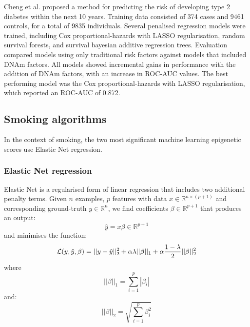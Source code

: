 \documentclass[draft]{article} %
\newcommand{\equationname}[1]{%
    \begingroup
        \leavevmode
        \addcontentsline{equ}{equations}{\protect\numberline{\theequation}#1}%
    \endgroup   
}
\begin{document}
Cheng et al. \cite{cheng2023development} proposed a method for predicting the risk of developing type 2 diabetes within the next 10 years. Training data consisted of 374 cases and \num{9461} controls, for a total of \num{9835} individuals. Several penalised regression models were trained, including Cox proportional-hazards with LASSO regularisation, random survival forests, and survival bayesian additive regression trees. Evaluation compared models using only traditional risk factors against models that included DNAm factors. All models showed incremental gains in performance with the addition of DNAm factors, with an increase in ROC-AUC values. The best performing model was the Cox proportional-hazards with LASSO regularisation, which reported an ROC-AUC of 0.872.

\subsection{Smoking algorithms}
In the context of smoking, the two most significant machine learning epigenetic scores use Elastic Net regression.

\subsubsection{Elastic Net regression} \label{sec:lin-elastic-net}
Elastic Net \cite{zou2005regularization} is a regularised form of linear regression that includes two additional penalty terms.
Given \(n\) examples, \(p\) features with data \(x \in \mathbb{R}^{n \times (p + 1)}\) and corresponding ground-truth \(y \in \mathbb{R}^n\), we find coefficients \(\beta \in \mathbb{R}^{p + 1}\) that produces an output:
\[\hat{y} = x \beta \in \mathbb{R}^{p + 1}\]
and minimises the function:
\begin{equation} \equationname{Elastic Net linear regression} \label{eqn:lin_elastic_net}
    \mathcal{L}(y, \hat{y}, \beta) = ||y - \hat{y}||_2^2 + \alpha\lambda||\beta||_1 + \alpha\frac{1 - \lambda}{2}||\beta||_2^2
\end{equation}
where
\[||\beta||_1 = \sum_{i=1}^{p} |\beta_i|\]
and:
\[||\beta||_2 = \sqrt{\sum_{i=1}^{p} \beta_i^2}\]
\end{document}
